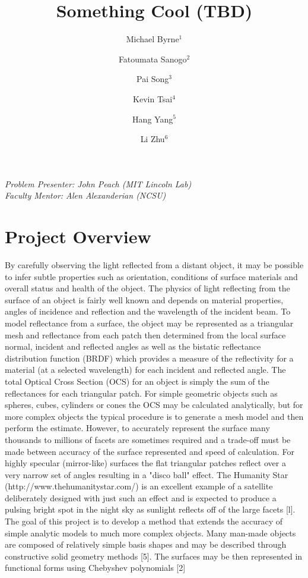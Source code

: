 \documentclass[11pt]{amsart}
\author{Michael Byrne$^1$}
\author{Fatoumata Sanogo$^2$}
\author{Pai Song$^3$\\}
\author{Kevin Tsai$^4$}
\author{Hang Yang$^5$}
\author{Li Zhu$^6$}
\title{Something Cool (TBD)}
\theoremstyle{definition}
\begin{document}
\maketitle

{
\noindent
\textit{
Problem Presenter:  John Peach (MIT Lincoln Lab)\\
Faculty Mentor: Alen Alexanderian (NCSU)
}
}
\section{Project Overview}
By carefully observing the light reflected from a distant object, it may be possible to infer subtle properties such as
orientation, conditions of surface materials and overall status and health of the object. The physics of light reflecting from
the surface of an object is fairly well known and depends on material properties, angles of incidence and reflection and the
wavelength of the incident beam. To model reflectance from a surface, the object may be represented as a triangular mesh
and reflectance from each patch then determined from the local surface normal, incident and reflected angles as well as the
bistatic reflectance distribution function (BRDF) which provides a measure of the reflectivity for a material (at a selected
wavelength) for each incident and reflected angle.
The total Optical Cross Section (OCS) for an object is simply the sum of the reflectances for each triangular patch. For
simple geometric objects such as spheres, cubes, cylinders or cones the OCS may be calculated analytically, but for more
complex objects the typical procedure is to generate a mesh model and then perform the estimate. However, to accurately
represent the surface many thousands to millions of facets are sometimes required and a trade-off must be made between
accuracy of the surface represented and speed of calculation. For highly specular (mirror-like) surfaces the flat triangular
patches reflect over a very narrow set of angles resulting in a "disco ball" effect. The Humanity Star
(http://www.thehumanitystar.com/) is an excellent example of a satellite deliberately designed with just such an effect and
is expected to produce a pulsing bright spot in the night sky as sunlight reflects off of the large facets [l].
The goal of this project is to develop a method that extends the accuracy of simple analytic models to much more complex
objects. Many man-made objects are composed of relatively simple basis shapes and may be described through constructive
solid geometry methods [5]. The surfaces may be then represented in functional forms using Chebyshev polynomials [2]
\end{document}
